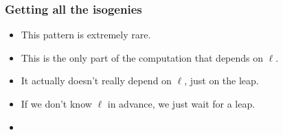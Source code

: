 \documentclass[10pt]{beamer}
\newcommand{\0}{\mathcal{O}}  %
\begin{document}
\begin{frame}
  \frametitle{Getting all the isogenies}

  \begin{itemize}
  \item<1-5> This pattern is extremely rare.
  \item<2> \large This is the only part of the computation that depends on $\ell$.
  \item<3> \Large It actually doesn't really depend on $\ell$, just on the
    \alert{leap}.
  \item<4> \huge If we don't know $\ell$ in advance, we just wait for
    a leap.
  \item<5-> 
  \end{itemize}
\end{frame}
\end{document}
